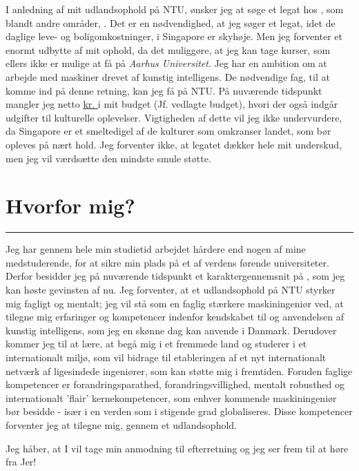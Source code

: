 \documentclass[../Ansoegning.tex]{subfiles}
\begin{document}
I anledning af mit udlandsophold på NTU, ønsker jeg at søge et legat hos \textit{\FondNavn}, som blandt andre områder, \Aarsag. Det er en nødvendighed, at jeg søger et legat, idet de daglige leve- og boligomkostninger, i Singapore er skyhøje. Men jeg forventer et enormt udbytte af mit ophold, da det muliggøre, at jeg kan tage kurser, som ellers ikke er mulige at få på \textit{Aarhus Universitet}. Jeg har en ambition om at arbejde med maskiner drevet af kunstig intelligens. De nødvendige fag, til at komme ind på denne retning, kan jeg få på NTU. På nuværende tidspunkt mangler jeg netto \underline{\Beloeb kr. } i mit budget (Jf. vedlagte budget), hvori der også indgår udgifter til kulturelle oplevelser. Vigtigheden af dette vil jeg ikke undervurdere, da Singapore er et smeltedigel af de kulturer som omkranser landet, som bør opleves på nært hold. Jeg forventer ikke, at legatet dækker hele mit underskud, men jeg vil værdsætte den mindste smule støtte. \vspace{\VSecSpace}
\section*{Hvorfor mig?}\vspace{-3mm}
\rule{1\textwidth}{0.5pt}\vspace{\VRuleDistSmall}

Jeg har gennem hele min studietid arbejdet hårdere end nogen af mine medstuderende, for at sikre min plads på et af verdens førende universiteter. Derfor besidder jeg på nuværende tidspunkt et karaktergennemsnit på \avgKar, som jeg kan høste gevinsten af nu. Jeg forventer, at et udlandsophold på NTU styrker mig fagligt og mentalt; jeg vil stå som en faglig stærkere maskiningeniør ved, at tilegne mig erfaringer og kompetencer indenfor kendskabet til og anvendelsen af kunstig intelligens, som jeg en skønne dag kan anvende i Danmark. Derudover kommer jeg til at lære, at begå mig i et fremmede land og studerer i et internationalt miljø, som vil bidrage til etableringen af et nyt internationalt netværk af ligesindede ingeniører, som kan støtte mig i fremtiden. Foruden faglige kompetencer er forandringsparathed, forandringsvillighed, mentalt robusthed og internationalt 'flair' kernekompetencer, som enhver kommende maskiningeniør bør besidde - især i en verden som i stigende grad globaliseres. Disse kompetencer forventer jeg at tilegne mig, gennem et udlandsophold.

Jeg håber, at I vil tage min anmodning til efterretning og jeg ser frem til at høre fra Jer!
\end{document}
